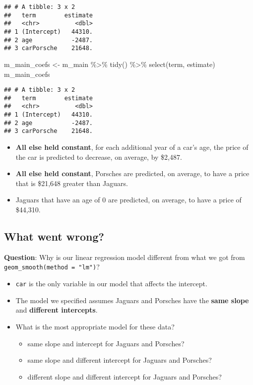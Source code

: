 \documentclass[
]{article}
\newenvironment{Shaded}{\begin{snugshade}}{\end{snugshade}}
\newcommand{\FunctionTok}[1]{\textcolor[rgb]{0.00,0.00,0.00}{#1}}
\newcommand{\NormalTok}[1]{#1}
\newcommand{\OtherTok}[1]{\textcolor[rgb]{0.56,0.35,0.01}{#1}}
\newcommand{\SpecialCharTok}[1]{\textcolor[rgb]{0.00,0.00,0.00}{#1}}
\providecommand{\tightlist}{%
  \setlength{\itemsep}{0pt}\setlength{\parskip}{0pt}}
\begin{document}
\begin{verbatim}
## # A tibble: 3 x 2
##   term        estimate
##   <chr>          <dbl>
## 1 (Intercept)   44310.
## 2 age           -2487.
## 3 carPorsche    21648.
\end{verbatim}

\begin{Shaded}
\begin{Highlighting}[]
\NormalTok{m\_main\_coefs }\OtherTok{\textless{}{-}}\NormalTok{ m\_main }\SpecialCharTok{\%\textgreater{}\%}
  \FunctionTok{tidy}\NormalTok{() }\SpecialCharTok{\%\textgreater{}\%}
  \FunctionTok{select}\NormalTok{(term, estimate)}
\NormalTok{m\_main\_coefs}
\end{Highlighting}
\end{Shaded}

\begin{verbatim}
## # A tibble: 3 x 2
##   term        estimate
##   <chr>          <dbl>
## 1 (Intercept)   44310.
## 2 age           -2487.
## 3 carPorsche    21648.
\end{verbatim}

\begin{itemize}
\item
  \textbf{All else held constant}, for each additional year of a car's
  age, the price of the car is predicted to decrease, on average, by
  \$2,487.
\item
  \textbf{All else held constant}, Porsches are predicted, on average,
  to have a price that is \$21,648 greater than Jaguars.
\item
  Jaguars that have an age of 0 are predicted, on average, to have a
  price of \$44,310.
\end{itemize}

\hypertarget{what-went-wrong}{%
\subsection{What went wrong?}\label{what-went-wrong}}

\textbf{Question}: Why is our linear regression model different from
what we got from \texttt{geom\_smooth(method\ =\ "lm")}?

\begin{itemize}
\item
  \texttt{car} is the only variable in our model that affects the
  intercept.
\item
  The model we specified assumes Jaguars and Porsches have the
  \textbf{same slope} and \textbf{different intercepts}.
\item
  What is the most appropriate model for these data?

  \begin{itemize}
  \tightlist
  \item
    same slope and intercept for Jaguars and Porsches?
  \item
    same slope and different intercept for Jaguars and Porsches?
  \item
    different slope and different intercept for Jaguars and Porsches?
  \end{itemize}
\end{itemize}
\end{document}
